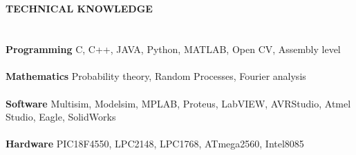 \documentclass[a4paper,12pt]{report}
\begin{document}
\newpage
\\
\vspace{10cm}
\begin{adjustwidth}{-0.59in}{-0.52in}\\
\\
\\
\textbf{TECHNICAL KNOWLEDGE}
\\
\\
\\
\textbf{Programming}      \hspace{10pt} C, C++, JAVA, Python, MATLAB, Open CV, Assembly level
 \\
\\
\textbf{Mathematics}       \hspace{10pt} Probability theory, Random Processes, Fourier analysis
 \\
\\
\textbf{Software} \hspace{10pt}      \hspace{10pt} Multisim, Modelsim, MPLAB, Proteus, LabVIEW, AVRStudio, Atmel Studio,  Eagle, \hspace{10pt} SolidWorks
 \\
\\
\textbf{Hardware} \hspace{10pt} PIC18F4550, LPC2148, LPC1768, ATmega2560, Intel8085
\end{adjustwidth}
\end{document}
